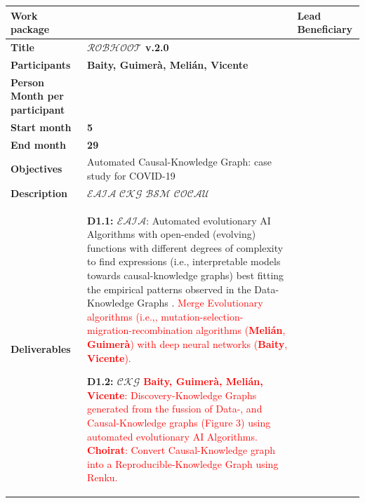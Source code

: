 \documentclass[11pt, a4paper]{article} %
\begin{document}
\begin{table}[h!]
\begin{center}
  \begin{tabular}{|m{3cm} || m{12cm} || m{1cm}|}
    \hline\hline
    \rowcolor{lightpink!30}
    {\bf Work package} & & {\bf Lead Beneficiary} \\
    \hline\hline
    \rowcolor{piggypink!20}
    {\bf Title} & {\bf $\mathcal{ROBHOOT}$ v.2.0} &  \\
    \hline\hline
    \rowcolor{piggypink!20}
    {\bf Participants} & {\bf Baity, Guimer\`a, Meli\'an, Vicente} & \\
    \hline\hline
    \rowcolor{piggypink!20}
    {\bf Person Month per participant} & & \\
    \hline\hline
    \rowcolor{piggypink!20}
    {\bf Start month} & {\bf 5} & \\
    \hline\hline
    \rowcolor{piggypink!40}
    {\bf End month} & {\bf 29} & \\
    \hline\hline
    \rowcolor{piggypink!40}
    {\bf Objectives} & Automated Causal-Knowledge Graph: case study for COVID-19 & \\
    \hline\hline
    \rowcolor{piggypink!40}
    {\bf Description} & $\mathcal{EAIA}$ $\mathcal{CKG}$ $\mathcal{BSM}$ $\mathcal{COCAU}$ & \\
    \hline\hline
    \rowcolor{piggypink!40}
    {\bf Deliverables} & {\bf D1.1: $\mathcal{EAIA}$}:
                         Automated evolutionary AI Algorithms with open-ended (evolving) functions with
                         different degrees of complexity to find expressions (i.e., interpretable models towards
                         causal-knowledge graphs) best fitting
                         the empirical patterns observed in the Data-Knowledge Graphs
                         \citep{Guimera2020,Steinruecken}. \textcolor{red}{Merge Evolutionary algorithms (i.e.,,
                         mutation-selection-migration-recombination algorithms
                         ({\bf Meli\'an}, {\bf Guimer\`a}) with deep neural networks
                         ({\bf Baity}, {\bf Vicente}).}
                         
                         {\bf D1.2: $\mathcal{CKG}$} \textcolor{red}{{\bf Baity, Guimer\`a, Meli\'an, Vicente}:
                         Discovery-Knowledge Graphs generated from the fussion of
                         Data-, and Causal-Knowledge graphs (Figure 3) using automated evolutionary
                         AI Algorithms. {\bf Choirat}: Convert Causal-Knowledge graph into a
                         Reproducible-Knowledge Graph using Renku.}
    

\end{tabular}
\end{center}
\end{table}
\end{document}
